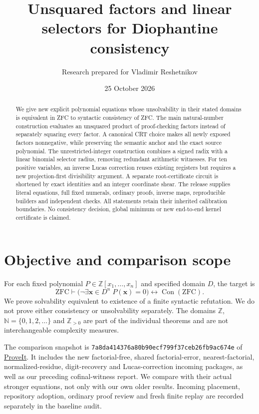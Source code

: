 \documentclass[11pt]{article}
\title{Unsquared factors and linear selectors for Diophantine consistency}
\author{Research prepared for Vladimir Reshetnikov}
\date{25 October 2026}
\theoremstyle{definition}\newtheorem{definition}[theorem]{Definition}
\theoremstyle{remark}\newtheorem{remark}[theorem]{Remark}
\newcommand{\Z}{\mathbb Z}\newcommand{\N}{\mathbb N}
\newcommand{\Con}{\operatorname{Con}}
\begin{document}
\maketitle
\begin{abstract}
We give new explicit polynomial equations whose unsolvability in their
stated domains is equivalent in ZFC to syntactic consistency of ZFC.
The main natural-number construction evaluates an unsquared product of
proof-checking factors instead of separately squaring every factor.
A canonical CRT choice makes all newly exposed factors nonnegative,
while preserving the semantic anchor and the exact source polynomial.
The unrestricted-integer construction combines a signed radix with a
linear binomial selector radius, removing redundant arithmetic witnesses.
For ten positive variables, an inverse Lucas correction reuses existing
registers but requires a new projection-first divisibility argument.
A separate root-certificate circuit is shortened by exact identities
and an integer coordinate shear.
The release supplies literal equations, full fixed numerals, ordinary
proofs, inverse maps, reproducible builders and independent checks.
All statements retain their inherited calibration boundaries. No
consistency decision, global minimum or new end-to-end kernel certificate
is claimed.
\end{abstract}
\tableofcontents
\section{Objective and comparison scope}
For each fixed polynomial $P\in\Z[x_1,\ldots,x_n]$ and specified domain $D$,
the target is
\[
 \mathrm{ZFC}\vdash
 \bigl(\neg\exists\boldsymbol{x}\in D^n\;P(\boldsymbol{x})=0\bigr)
 \longleftrightarrow\Con(\mathrm{ZFC}).
\]
We prove solvability equivalent to existence of a finite syntactic
refutation. We do not prove either consistency or unsolvability separately.
The domains $\Z$, $\N=\{0,1,2,\ldots\}$ and $\Z_{>0}$ are part of the
individual theorems and are not interchangeable complexity measures.

The comparison snapshot is
\texttt{7a8da414376a80b90ecf799f37ceb26fb9ac674e} of
\href{https://github.com/VladimirReshetnikov/ProveIt}{ProveIt}.
It includes the new factorial-free, shared factorial-error, nearest-factorial,
normalized-residue, digit-recovery and Lucas-correction incoming packages,
as well as our preceding cofinal-witness report. We compare with their
actual stronger equations, not only with our own older results. Incoming
placement, repository adoption, ordinary proof review and fresh finite
replay are recorded separately in the baseline audit.
\end{document}
